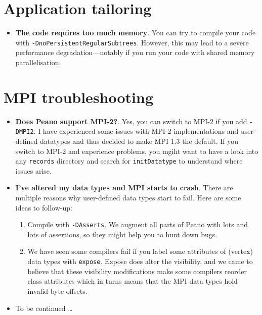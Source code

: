 \section{Application tailoring}

\begin{itemize}
  \item {\bf The code requires too much memory}.
  You can try to compile your code with
  \linebreak \texttt{-DnoPersistentRegularSubtrees}.
  However, this may lead to a severe performance \linebreak
  degradation---notably if you run your code with shared memory parallelisation.
\end{itemize}

\section{MPI troubleshooting}

\begin{itemize}
  \item {\bf Does Peano support MPI-2?}. Yes, you can switch to MPI-2 if you add
  \texttt{-DMPI2}. I have experienced some issues with MPI-2 implementations and
  user-defined datatypes and thus decided to make MPI 1.3 the default. If you
  switch to MPI-2 and experience problems, you  mgiht want to have a look into
  any \texttt{records} directory and search for \texttt{initDatatype} to
  understand where issues arise.
  \item {\bf I've altered my data types and MPI starts to crash}. There are
  multiple reasons why user-defined data types start to fail. Here are some
  ideas to follow-up:
    \begin{enumerate}
      \item Compile with \texttt{-DAsserts}. We augment all parts of Peano with
      lots and lots of assertions, so they might help you to hunt down bugs.
      \item We have seen some compilers fail if you label some attributes of
      (vertex) data types with \texttt{expose}. Expose does alter the
      visibility, and we came to believe that these visibility modifications
      make some compilers reorder class attributes which in turns means that the
      MPI data types hold invalid byte offsets.
    \end{enumerate}
  \item To be continued \ldots
\end{itemize}



